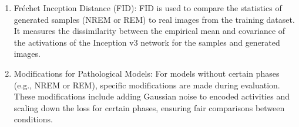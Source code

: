 \documentclass{midl} %
\begin{document}
\begin{enumerate}
  \item Fréchet Inception Distance (FID): FID is used to compare the statistics of generated samples (NREM or REM) to real images from the training dataset. It measures the dissimilarity between the empirical mean and covariance of the activations of the Inception v3 network for the samples and generated images.

  \item Modifications for Pathological Models: For models without certain phases (e.g., NREM or REM), specific modifications are made during evaluation. These modifications include adding Gaussian noise to encoded activities and scaling down the loss for certain phases, ensuring fair comparisons between conditions.
\end{enumerate}
\end{document}
